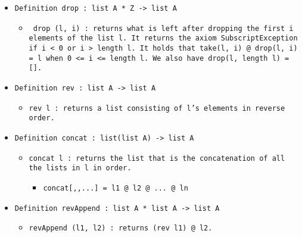 \documentclass[11pt]{report}
\begin{document}
\begin{itemize}
\begin{itemize}
\end{itemize}

\item  \texttt{Definition drop : list A * Z -> list A}

\begin{itemize}
\item \begin{flushleft} \texttt{ drop (l, i) : returns what is left after dropping the first i elements of the list l. It returns the axiom SubscriptException if i < 0 or i > length l. It holds that take(l, i) @ drop(l, i) = l when 0 <= i <= length l. We also have drop(l, length l) = []. } \end{flushleft}



\end{itemize}

\item  \texttt{Definition rev : list A -> list A}

\begin{itemize}
\item  \texttt{rev l : returns a list consisting of l's elements in reverse order.}



\end{itemize}

\item  \texttt{Definition concat : list(list A) -> list A}

\begin{itemize}
\item  \begin{flushleft} \texttt{concat l : returns the list that is the concatenation of all the lists in l in order.} \end{flushleft}

\begin{itemize}
\item  \texttt{concat[,,...] = l1 @ l2 @ ... @ ln}
\end{itemize}

\end{itemize}

\item  \texttt{Definition revAppend : list A * list A -> list A}

\begin{itemize}
\item  \texttt{revAppend (l1, l2) :  returns (rev l1) @ l2.}
\end{itemize}


\end{itemize}
\end{document}
